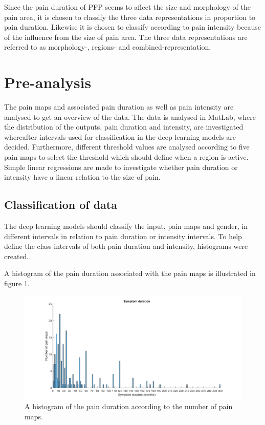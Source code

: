 \noindent
Since the pain duration of PFP seems to affect the size and morphology of the pain area, it is chosen to classify the three data representations in proportion to pain duration. Likewise it is chosen to classify according to pain intensity because of the influence from the size of pain area. 
The three data representations are referred to as morphology-, regions- and combined-representation.
\newpage

\section{Pre-analysis}
The pain maps and associated pain duration as well as pain intensity are analysed to get an overview of the data. The data is analysed in MatLab, where the distribution of the outputs, pain duration and intensity, are investigated whereafter intervals used for classification in the deep learning models are decided. Furthermore, different threshold values are analysed according to five pain maps to select the threshold which should define when a region is active.
Simple linear regressions are made to investigate whether pain duration or intensity have a linear relation to the size of pain.


\subsection{Classification of data}
The deep learning models should classify the input, pain maps and gender, in different intervals in relation to pain duration or intensity intervals. To help define the class intervals of both pain duration and intensity, histograms were created.

\noindent
A histogram of the pain duration associated with the pain maps is illustrated in figure \ref{fig:histoduration}.

\begin{figure} [H]
\centering
\includegraphics[width=1\textwidth]{figures/histogramDuration}
\caption{A histogram of the pain duration according to the number of pain maps.}
\label{fig:histoduration}
\end{figure}

